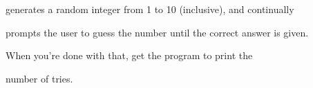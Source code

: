 generates a random integer from 1 to 10 (inclusive), and continually

prompts the user to guess the number until the correct answer is given.

When you're done with that, get the program to print the

number of tries.


